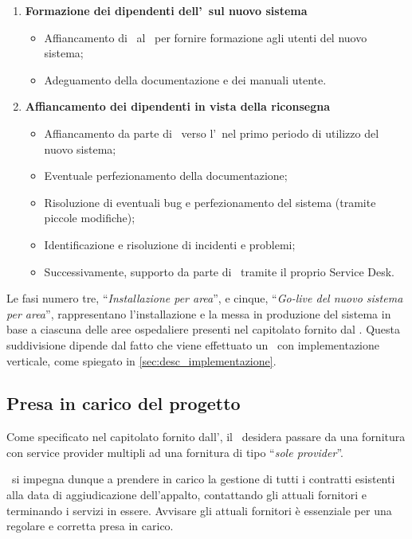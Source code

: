 \begin{enumerate}
		\item \textbf{Formazione dei dipendenti dell'\istituto~sul nuovo sistema}
		\begin{itemize}[noitemsep]
			\renewcommand\labelitemi{--}
			\item Affiancamento di \azienda~al \proponente~per fornire formazione agli utenti del nuovo sistema;
			\item Adeguamento della documentazione e dei manuali utente.
		\end{itemize}
		
		\item \textbf{Affiancamento dei dipendenti in vista della riconsegna}
			\begin{itemize}[noitemsep]
				\renewcommand\labelitemi{--}
				\item Affiancamento da parte di \azienda~verso l'\istituto~nel primo periodo di utilizzo del nuovo sistema;
				\item Eventuale perfezionamento della documentazione;
				\item Risoluzione di eventuali bug e perfezionamento del sistema (tramite piccole modifiche);
				\item Identificazione e risoluzione di incidenti e problemi;
				\item Successivamente, supporto da parte di \azienda~tramite il proprio Service Desk.
			\end{itemize}
		
	\end{enumerate}

	Le fasi numero tre, ``\textit{Installazione per area}'', e cinque, ``\textit{Go-live del nuovo sistema per area}'', rappresentano l'installazione e la messa in produzione del sistema in base a ciascuna delle aree ospedaliere presenti nel capitolato fornito dal \proponente.
	Questa suddivisione dipende dal fatto che viene effettuato un \rollout~con implementazione verticale, come spiegato in \ref{sec:desc_implementazione}.
	
	\subsection{Presa in carico del progetto}
	
		Come specificato nel capitolato fornito dall'\istituto, il \proponente~desidera passare da una fornitura con service provider multipli ad una fornitura di tipo ``\textit{sole provider}''.
	
		\azienda~si impegna dunque a prendere in carico la gestione di tutti i contratti esistenti alla data di aggiudicazione dell'appalto, contattando gli attuali fornitori e terminando i servizi in essere.
		Avvisare gli attuali fornitori è essenziale per una regolare e corretta presa in carico.
		
